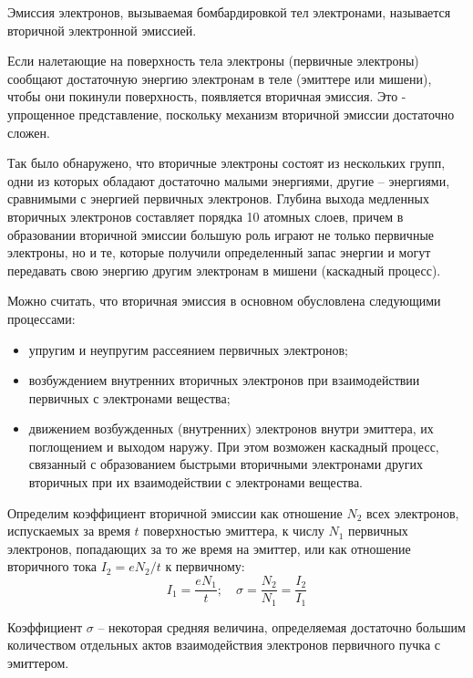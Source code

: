 
Эмиссия электронов, вызываемая бомбардировкой тел электронами, называется 
вторичной электронной эмиссией.

Если налетающие на поверхность тела электроны (первичные электроны) сообщают 
достаточную энергию электронам в теле (эмиттере или мишени), чтобы они покинули 
поверхность, появляется вторичная эмиссия. Это - упрощенное представление, 
поскольку механизм вторичной эмиссии достаточно сложен.

Так было обнаружено, что вторичные электроны состоят из нескольких групп, одни 
из которых обладают достаточно малыми энергиями, другие -- энергиями, 
сравнимыми с энергией первичных электронов. Глубина выхода медленных 
вторичных электронов составляет порядка 10 атомных слоев, причем в образовании 
вторичной эмиссии большую роль играют не только первичные электроны, но и те, 
которые получили определенный запас энергии и могут передавать свою энергию 
другим электронам в мишени (каскадный процесс).

Можно считать, что вторичная эмиссия в основном обусловлена следующими 
процессами:
\begin{itemize}
    \item упругим и неупругим рассеянием первичных электронов;
    \item возбуждением внутренних вторичных электронов при взаимодействии 
        первичных с электронами вещества;
    \item движением возбужденных (внутренних) электронов внутри эмиттера, их 
        поглощением и выходом наружу. При этом возможен каскадный процесс, 
        связанный с образованием быстрыми вторичными электронами других 
        вторичных при их взаимодействии с электронами вещества.
\end{itemize}

Определим коэффициент вторичной эмиссии как отношение \( N_2 \) всех 
электронов, испускаемых за время \( t \) поверхностью эмиттера, к числу \( N_1 \) 
первичных электронов, попадающих за то же время на эмиттер, или как отношение 
вторичного тока \( I_2 = eN_2 / t \) к первичному:
\begin{equation}
    I_1 = \frac{eN_1}{t};\quad
    \sigma = \frac{N_2}{N_1} = \frac{I_2}{I_1}
    \label{eq05.1.18}
\end{equation}
 
Коэффициент \( \sigma \) -- некоторая средняя величина, определяемая достаточно 
большим количеством отдельных актов взаимодействия электронов первичного пучка 
с эмиттером.

